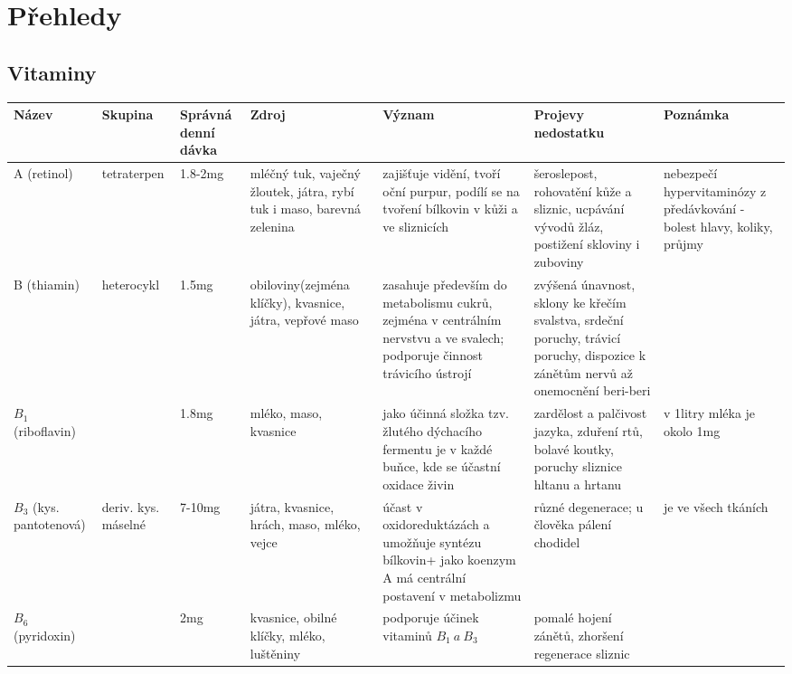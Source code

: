 \documentclass{article}
\begin{document}
\section{Přehledy}
    \begin{landscape}
    \subsection{Vitaminy}
        \begin{longtable}{| m{7em} | m{5em} | m{5em} | m{8em}<{\RaggedRight} | m{15em}<{\RaggedRight} | m{15em}<{\RaggedRight} | m{10em}<{\RaggedRight} |}
            \hline
            Název & Skupina & Správná denní dávka & Zdroj & Význam & Projevy nedostatku & Poznámka \\
            \hline
            A (retinol) & tetraterpen & 1.8-2mg & mléčný tuk, vaječný žloutek, játra, rybí tuk i maso, barevná zelenina & zajišťuje vidění, tvoří oční purpur, podílí se na tvoření bílkovin v kůži a ve sliznicích & šeroslepost, rohovatění kůže a sliznic, ucpávání vývodů žláz, postižení skloviny i zuboviny & nebezpečí hypervitaminózy z předávkování - bolest hlavy, koliky, průjmy \\
            \hline
            B (thiamin)& heterocykl & 1.5mg & obiloviny(zejména klíčky), kvasnice, játra, vepřové maso & zasahuje především do metabolismu cukrů, zejména v centrálním nervstvu a ve svalech; podporuje činnost trávicího ústrojí & zvýšená únavnost, sklony ke křečím svalstva, srdeční poruchy, trávicí poruchy, dispozice k zánětům nervů až onemocnění beri-beri & \\
            \hline
            $B_1$ (riboflavin) & & 1.8mg & mléko, maso, kvasnice & jako účinná složka tzv. žlutého dýchacího fermentu je v každé buňce, kde se účastní oxidace živin & zardělost a palčivost jazyka, zduření rtů, bolavé koutky, poruchy sliznice hltanu a hrtanu & v 1litry mléka je okolo 1mg \\
            \hline
            $B_3$ (kys. pantotenová) & deriv. kys. máselné & 7-10mg & játra, kvasnice, hrách, maso, mléko, vejce & účast v oxidoreduktázách a umožňuje syntézu bílkovin+ jako koenzym A má centrální postavení v metabolizmu & různé degenerace; u člověka pálení chodidel & je ve všech tkáních \\
            \hline
            $B_6$ (pyridoxin) & & 2mg & kvasnice, obilné klíčky, mléko, luštěniny & podporuje účinek vitaminů $B_1 ~a~ B_3$ & pomalé hojení zánětů, zhoršení regenerace sliznic & \\

\end{longtable}
\end{landscape}
\end{document}
